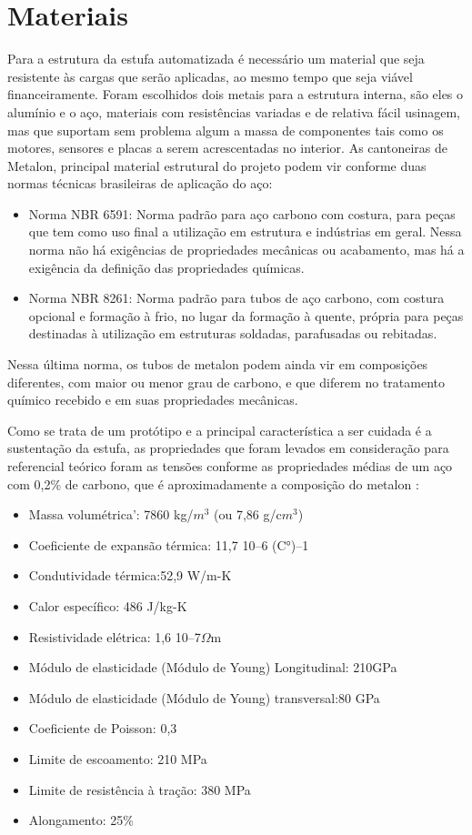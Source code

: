 \section{Materiais}

Para a estrutura da estufa automatizada é necessário um material que seja resistente às cargas que serão aplicadas, ao mesmo tempo que seja viável financeiramente. Foram escolhidos dois metais para a estrutura interna, são eles o alumínio e o aço, materiais com resistências variadas e de relativa fácil usinagem, mas que suportam sem problema algum a massa de componentes tais como os motores, sensores e placas a serem acrescentadas no interior. As cantoneiras de Metalon, principal material estrutural do projeto podem vir conforme duas normas técnicas brasileiras de aplicação do aço:

\begin{itemize}
	\item Norma NBR 6591: Norma padrão para aço carbono com costura, para peças que tem como uso final a utilização em estrutura e indústrias em geral. Nessa norma não há exigências de propriedades mecânicas ou acabamento, mas há a exigência da definição das propriedades químicas.
	\item Norma NBR 8261: Norma padrão para tubos de aço carbono, com costura opcional e formação à frio, no lugar da formação à quente, própria para peças destinadas à utilização em estruturas soldadas, parafusadas ou rebitadas.
\end{itemize}

Nessa última norma, os tubos de metalon podem ainda vir em composições diferentes, com maior ou menor grau de carbono, e que diferem no tratamento químico recebido e em suas propriedades mecânicas. \cite{tubonasa}

Como se trata de um protótipo e a principal característica a ser cuidada é a sustentação da estufa, as propriedades que foram levados em consideração para referencial teórico foram as tensões conforme 	as propriedades médias de um aço com 0,2\% de carbono, que é aproximadamente a composição do metalon \cite{callister2002wd}:

\begin{itemize}
	\item Massa volumétrica': 7860 kg/$m{^3}$ (ou 7,86 g/c$m{^3}$)
	\item Coeficiente de expansão térmica: 11,7 10--6 (C°)--1
	\item Condutividade térmica:52,9 W/m-K
	\item Calor específico: 486 J/kg-K
	\item Resistividade elétrica: 1,6 10--7$\Omega$m
	\item Módulo de elasticidade (Módulo de Young) Longitudinal: 210GPa
	\item Módulo de elasticidade (Módulo de Young) transversal:80 GPa
	\item Coeficiente de Poisson: 0,3
	\item Limite de escoamento: 210 MPa
	\item Limite de resistência à tração: 380 MPa
	\item Alongamento: 25\%
\end{itemize}

